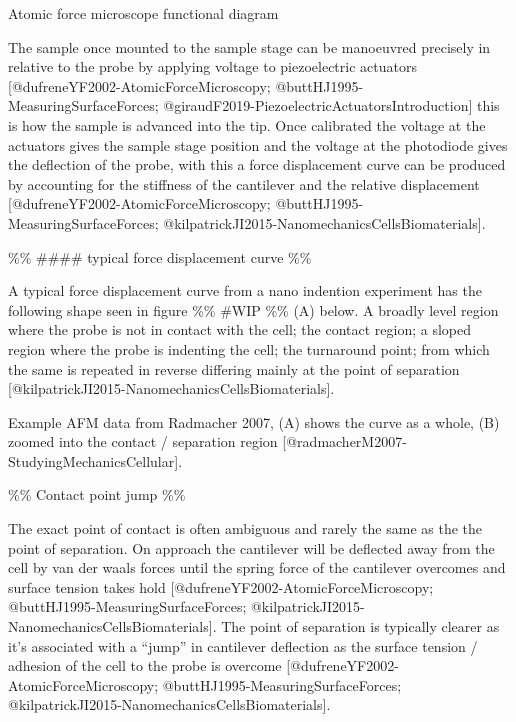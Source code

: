 \documentclass[
  paper=a4,
  ,captions=tableheading
]{scrartcl}
\renewenvironment{quote}{\begin{customblockquote}\list{}{\rightmargin=0em\leftmargin=0em}%
\item\relax\color{blockquote-text}\ignorespaces}{\unskip\unskip\endlist\end{customblockquote}}
\begin{document}
\begin{quote}
{} Atomic force microscope functional diagram
\end{quote}

The sample once mounted to the sample stage can be manoeuvred precisely
in relative to the probe by applying voltage to piezoelectric actuators
{[}@dufreneYF2002-AtomicForceMicroscopy;
@buttHJ1995-MeasuringSurfaceForces;
@giraudF2019-PiezoelectricActuatorsIntroduction{]} this is how the
sample is advanced into the tip. Once calibrated the voltage at the
actuators gives the sample stage position and the voltage at the
photodiode gives the deflection of the probe, with this a force
displacement curve can be produced by accounting for the stiffness of
the cantilever and the relative displacement
{[}@dufreneYF2002-AtomicForceMicroscopy;
@buttHJ1995-MeasuringSurfaceForces;
@kilpatrickJI2015-NanomechanicsCellsBiomaterials{]}.

\%\% \#\#\#\# typical force displacement curve \%\%

A typical force displacement curve from a nano indention experiment has
the following shape seen in figure \%\% \#WIP \%\% (A) below. A broadly
level region where the probe is not in contact with the cell; the
contact region; a sloped region where the probe is indenting the cell;
the turnaround point; from which the same is repeated in reverse
differing mainly at the point of separation
{[}@kilpatrickJI2015-NanomechanicsCellsBiomaterials{]}.

\begin{quote}
{} {} Example AFM data from Radmacher 2007, (A) shows the curve as a
whole, (B) zoomed into the contact / separation region
{[}@radmacherM2007-StudyingMechanicsCellular{]}.
\end{quote}

\%\% Contact point jump \%\%

The exact point of contact is often ambiguous and rarely the same as the
the point of separation. On approach the cantilever will be deflected
away from the cell by van der waals forces until the spring force of the
cantilever overcomes and surface tension takes hold
{[}@dufreneYF2002-AtomicForceMicroscopy;
@buttHJ1995-MeasuringSurfaceForces;
@kilpatrickJI2015-NanomechanicsCellsBiomaterials{]}. The point of
separation is typically clearer as it's associated with a ``jump'' in
cantilever deflection as the surface tension / adhesion of the cell to
the probe is overcome {[}@dufreneYF2002-AtomicForceMicroscopy;
@buttHJ1995-MeasuringSurfaceForces;
@kilpatrickJI2015-NanomechanicsCellsBiomaterials{]}.
\end{document}
